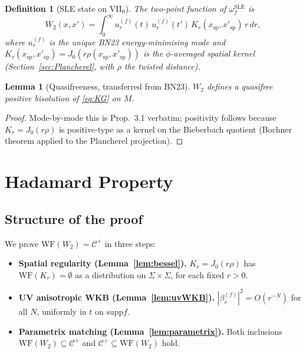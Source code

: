 \documentclass[12pt, a4paper]{article}
\newtheorem{lemma}[theorem]{Lemma}
\newtheorem{definition}[theorem]{Definition}
\theoremstyle{remark}
\newcommand{\SLE}{\mathrm{SLE}}
\newcommand{\WF}{\mathrm{WF}}
\newcommand{\supp}{\mathrm{supp}}
\begin{document}
\begin{definition}[SLE state on VII$_0$]\label{def:SLE}
  The two-point function of $\omega_f^{\SLE}$ is
  \begin{equation}\label{eq:2pt}
    W_2(x,x') = \int_0^\infty
      u_r^{(f)}(t)\,\overline{u_r^{(f)}(t')}\,
      K_r(x_{\mathrm{sp}},x'_{\mathrm{sp}})\,r\,dr,
  \end{equation}
  where $u_r^{(f)}$ is the unique BN23 energy-minimising mode and
  $K_r(x_{\mathrm{sp}},x'_{\mathrm{sp}}) = J_0(r\rho(x_{\mathrm{sp}},x'_{\mathrm{sp}}))$
  is the $\phi$-averaged spatial kernel
  (Section~\ref{sec:Plancherel}, with $\rho$ the twisted distance).
\end{definition}

\begin{lemma}[Quasifreeness, transferred from BN23]\label{lem:transfer}
  $W_2$ defines a quasifree positive bisolution of \eqref{eq:KG} on $M$.
\end{lemma}

\begin{proof}
  Mode-by-mode this is \cite{BN23} Prop.~3.1 verbatim;
  positivity follows because $K_r = J_0(r\rho)$ is positive-type as a
  kernel on the Bieberbach quotient (Bochner theorem applied to the
  Plancherel projection).
\end{proof}

\section{Hadamard Property}\label{sec:Hadamard}

\subsection{Structure of the proof}

We prove $\WF(W_2) = \mathcal{C}^+$ in three steps:
\begin{itemize}
\item \textbf{Spatial regularity (Lemma~\ref{lem:bessel}).}
  $K_r = J_0(r\rho)$ has $\WF(K_r) = \emptyset$ as a distribution on
  $\Sigma\times\Sigma$, for each fixed $r > 0$.
\item \textbf{UV anisotropic WKB (Lemma~\ref{lem:uvWKB}).}
  $|\beta_r^{(f)}|^2 = O(r^{-N})$ for all $N$, uniformly in $t$ on
  $\supp f$.
\item \textbf{Parametrix matching (Lemma~\ref{lem:parametrix}).}
  Both inclusions $\WF(W_2) \subseteq \mathcal{C}^+$ and
  $\mathcal{C}^+ \subseteq \WF(W_2)$ hold.
\end{itemize}
\end{document}
